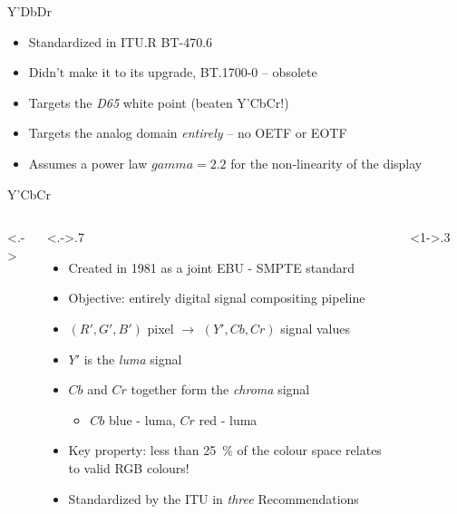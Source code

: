 \documentclass[aspectratio=169,usepdftitle=false]{fireshonks}
\begin{document}
\begin{frame}{Y'DbDr}
    \begin{itemize}
        \item Standardized in ITU.R BT-470.6 \parencite*{BT470}
        \item Didn't make it to its upgrade, BT.1700-0 -- obsolete
        \item Targets the \emph{D65} white point (beaten Y'CbCr!)
        \item Targets the analog domain \emph{entirely} -- no OETF or EOTF
        \item Assumes a power law $gamma = 2.2$ for the non-linearity of the display
    \end{itemize}
\end{frame}
\begin{frame}{Y'CbCr}
    \begin{columns}<.->
        \begin{column}<.->{.7\textwidth}
            \begin{itemize}
                \item Created in 1981 as a joint EBU - SMPTE standard
                \item Objective: entirely digital signal compositing pipeline
                \item $(R', G', B')$ pixel $\rightarrow$ $(Y', Cb, Cr)$ signal values
                \item $Y'$ is the \emph{luma} signal
                \item $Cb$ and $Cr$ together form the \emph{chroma} signal
                      \begin{itemize}
                          \item $Cb$ blue - luma, $Cr$ red - luma
                      \end{itemize}
                \item Key property: less than \qty{25}{\percent} of the colour space relates to valid RGB colours! \autocite{7261497}
                \item Standardized by the ITU in \emph{three} Recommendations
            \end{itemize}
        \end{column}
        \begin{column}<1->{.3\textwidth}
            \begin{figure}

\end{figure}
\end{column}
\end{columns}
\end{frame}
\end{document}
